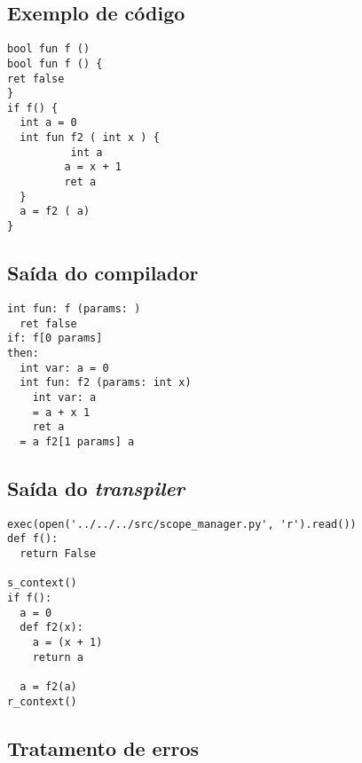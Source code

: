 \documentclass{article}
\begin{document}
\subsection{Exemplo de código}

\begin{verbatim}
bool fun f ()
bool fun f () {
ret false
}
if f() {
  int a = 0
  int fun f2 ( int x ) {
          int a
         a = x + 1
         ret a
  }
  a = f2 ( a)
}
\end{verbatim}

\subsection{Saída do compilador}

\begin{verbatim}
int fun: f (params: )
  ret false
if: f[0 params]
then:
  int var: a = 0
  int fun: f2 (params: int x)
    int var: a
    = a + x 1
    ret a
  = a f2[1 params] a
\end{verbatim}

\subsection{Saída do \emph{transpiler}}

\begin{verbatim}
exec(open('../../../src/scope_manager.py', 'r').read())
def f():
  return False

s_context()
if f():
  a = 0
  def f2(x):
    a = (x + 1)
    return a

  a = f2(a)
r_context()
\end{verbatim}

\subsection{Tratamento de erros}
\end{document}
